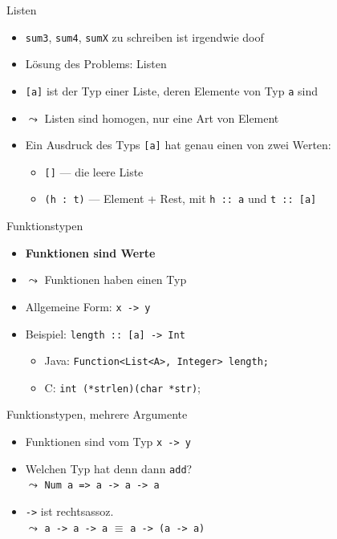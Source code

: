 \documentclass{beamer}
\begin{document}
\begin{frame}{Listen}
	\begin{itemize}
		\item \texttt{sum3}, \texttt{sum4}, \texttt{sumX} zu schreiben ist irgendwie doof
		\pause
		\item Lösung des Problems: Listen
		\item \texttt{[a]} ist der Typ einer Liste, deren Elemente von Typ \texttt{a} sind
		\item $\leadsto$ Listen sind homogen, nur eine Art von Element
	\end{itemize}


	\begin{itemize}
		\item Ein Ausdruck des Typs \texttt{[a]} hat genau einen von zwei Werten:
		\begin{itemize}
			\item \texttt{[]} --- die leere Liste
			\item \texttt{(h : t)} --- Element + Rest, mit \texttt{h :: a} und \texttt{t :: [a]}
		\end{itemize}
	\end{itemize}
\end{frame}

\begin{frame}{Funktionstypen}
	\begin{itemize}
		\item \textbf{Funktionen sind Werte}
		\item $\leadsto$ Funktionen haben einen Typ
		\item Allgemeine Form: \texttt{x -> y}
		\item Beispiel: \texttt{length :: [a] -> Int}
		\begin{itemize}
			\item Java: \texttt{Function<List<A>, Integer> length;}
			\item C: \texttt{int (*strlen)(char *str)};
		\end{itemize}
	\end{itemize}
\end{frame}

\begin{frame}{Funktionstypen, mehrere Argumente}

	\begin{itemize}
		\item Funktionen sind vom Typ \texttt{x -> y}
		\item Welchen Typ hat denn dann \texttt{add}? \\
		\pause
		$\leadsto$ \texttt{Num a => a -> a -> a}
		\item \texttt{->} ist rechtsassoz. \\
		$\leadsto$ \texttt{a -> a -> a} $\equiv$ \texttt{a -> (a -> a)}
	\end{itemize}
\end{frame}
\end{document}
